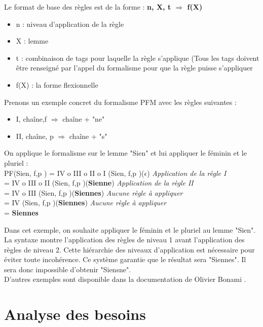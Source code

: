 \documentclass[12pt,a4paper]{article}
\begin{document}
\smallbreak
Le format de base des règles est de la forme : \textbf{n, X, t $\Longrightarrow$ f(X) } \\
\begin{itemize}
    \item n : niveau d’application de la règle
    \item X : lemme
    \item t : combinaison de tags pour laquelle la règle s'applique (Tous les tags doivent être renseigné par l'appel du formalisme pour que la règle puisse s'appliquer
    \item f(X) : la forme flexionnelle
\end{itemize}

Prenons un exemple concret du formalisme PFM avec les règles suivantes : \\
\begin{itemize}
    \item I, chaîne,{f} $\Longrightarrow$ chaîne + "ne"
    \item II, chaîne, {p} $\Longrightarrow$ chaîne + "s"
\end{itemize}

On applique le formalisme sur le lemme "Sien" et lui appliquer le féminin et le pluriel : \\
PF(Sien, {f,p} ) = IV o III o II o I (Sien, {f,p} )(\textbf{$\epsilon$}) \textit{Application de la règle I} \\
                 = IV o III o II (Sien, {f,p} )(\textbf{Sienne}) \textit{Application de la règle II} \\
                 = IV o III (Sien, {f,p} )(\textbf{Siennes}) \textit{Aucune règle à appliquer} \\
                 = IV (Sien, {f,p} )(\textbf{Siennes}) \textit{Aucune règle à appliquer} \\
                 =\textbf{ Siennes }

Dans cet exemple, on souhaite appliquer le féminin et le pluriel au lemme "Sien".
La syntaxe montre l'application des règles de niveau 1 avant l'application des règles de niveau 2.
Cette hiérarchie des niveaux d'application est nécessaire pour éviter toute incohérence. Ce système garantie que le résultat sera "Siennes". Il sera donc impossible d'obtenir "Siensne". \\
D'autres exemples sont disponible dans la documentation de Olivier Bonami \cite{PFM}.

\newpage
\section{Analyse des besoins}
\end{document}
